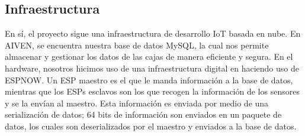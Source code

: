 \subsection{Infraestructura}
En sí, el proyecto sigue una infraestructura de desarrollo IoT basada en nube. En AIVEN, se encuentra nuestra base de datos MySQL, la cual nos permite almacenar y gestionar los datos de las cajas de manera eficiente y segura. En el hardware, nosotros hicimos uso de una infraestructura digital en haciendo uso de ESPNOW. Un ESP maestro es el que le manda información a la base de datos, mientras que los ESPs esclavos son los que recogen la información de los sensores y se la envían al maestro. Esta información es enviada por medio de una serialización de datos; 64 bits de información son enviados en un paquete de datos, los cuales son deserializados por el maestro y enviados a la base de datos. 

